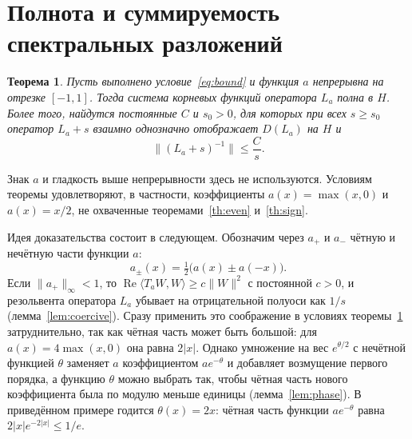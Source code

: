 \documentclass[12pt,a4paper]{article}
\newtheorem{theorem}{Теорема}
\theoremstyle{definition}
\newcommand{\norm}[1]{\lVert#1\rVert}
\newcommand{\abs}[1]{\lvert#1\rvert}
\newcommand{\inner}[2]{\langle#1,#2\rangle}
\begin{document}
\section{Полнота и суммируемость спектральных разложений}
\begin{theorem}\label{th:complete}
Пусть выполнено условие~\eqref{eq:bound} и функция $a$ непрерывна на отрезке $[-1,1]$.
Тогда система корневых функций оператора $L_a$ полна в $H$. Более того, найдутся
постоянные $C$ и $s_0>0$, для которых при всех $s\ge s_0$ оператор $L_a+s$ взаимно
однозначно отображает $D(L_a)$ на $H$ и
\[
 \norm{(L_a+s)^{-1}}\le\frac Cs .
\]
\end{theorem}
Знак $a$ и гладкость выше непрерывности здесь не используются. Условиям теоремы
удовлетворяют, в частности, коэффициенты $a(x)=\max(x,0)$ и $a(x)=x/2$, не охваченные
теоремами~\ref{th:even} и~\ref{th:sign}.

Идея доказательства состоит в следующем. Обозначим через $a_+$ и $a_-$ чётную и нечётную
части функции $a$:
\[
 a_\pm(x)=\tfrac12\bigl(a(x)\pm a(-x)\bigr).
\]
Если $\norm{a_+}_\infty<1$, то $\operatorname{Re}\inner{T_aW}{W}\ge c\norm W^2$ с
постоянной $c>0$, и резольвента оператора $L_a$ убывает на отрицательной полуоси как
$1/s$ (лемма~\ref{lem:coercive}). Сразу применить это соображение в условиях
теоремы~\ref{th:complete} затруднительно, так как чётная часть может быть большой: для
$a(x)=4\max(x,0)$ она равна $2\abs x$. Однако умножение на вес $e^{\theta/2}$ с нечётной
функцией $\theta$ заменяет $a$ коэффициентом $ae^{-\theta}$ и добавляет возмущение первого
порядка, а функцию $\theta$ можно выбрать так, чтобы чётная часть нового коэффициента
была по модулю меньше единицы (лемма~\ref{lem:phase}). В приведённом примере годится
$\theta(x)=2x$: чётная часть функции $ae^{-\theta}$ равна $2\abs xe^{-2\abs x}\le1/e$.
\end{document}
